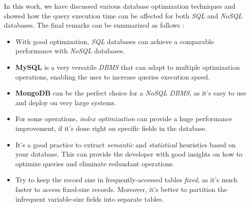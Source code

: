 In this work, we have discussed various database optimization techniques and showed how the query execution time can be affected for both \emph{SQL} and \emph{NoSQL} databases. The final remarks can be summarized as follows :
\begin{itemize}
    \item With good optimization, \emph{SQL} databases can achieve a comparable performance with \emph{NoSQL} databases.
    \item \textbf{MySQL} is a very versatile \emph{DBMS} that can adapt to multiple optimization operations, enabling the user to increase queries execution speed.
    \item \textbf{MongoDB} can be the perfect choice for a \emph{NoSQL DBMS}, as it's easy to use and deploy on very large systems.
    \item For some operations, \emph{index optimization} can provide a huge performance improvement, if it's done right on specific fields in the database.
    \item It's a good practice to extract \emph{semantic} and \emph{statistical} heuristics based on your database. This can provide the developer with good insights on how to optimize queries and eliminate redundant operations.
    \item Try to keep the record size in frequently-accessed tables \emph{fixed}, as it's much faster to access fixed-size records. Moreover, it's better to partition the infrequent variable-size fields into separate tables.
\end{itemize}